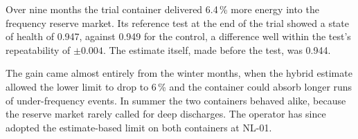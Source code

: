 Over nine months the trial container delivered 6.4\,\% more energy into
the frequency reserve market. Its reference test at the end of the trial
showed a state of health of 0.947, against 0.949 for the control, a
difference well within the test's repeatability of \(\pm 0.004\). The
estimate itself, made before the test, was 0.944.

The gain came almost entirely from the winter months, when the hybrid
estimate allowed the lower limit to drop to 6\,\% and the container could
absorb longer runs of under-frequency events. In summer the two containers
behaved alike, because the reserve market rarely called for deep
discharges. The operator has since adopted the estimate-based limit on
both containers at NL-01.
